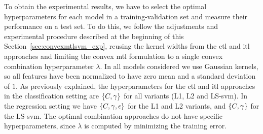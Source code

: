 To obtain the experimental results, we have to select the optimal hyperparameters for each model in a training-validation set and measure their performance on a test set. To do this, we follow the adjustments and experimental procedure described at the beginning of this Section~\ref{sec:convexmtlsvm_exp}, reusing the kernel widths from the \acrshort{ctl} and \acrshort{itl} approaches and limiting the convex \acrshort{mtl} formulation to a single convex combination hyperparameter $\lambda$.
%
In all models considered we use Gaussian kernels, so all features have been normalized to have zero mean and a standard deviation of $1$.
As previously explained, the hyperparameters for the \acrshort{ctl} and \acrshort{itl} approaches in the classification setting are $\left\{C, \gamma\right\}$ for all variants (L1, L2 and LS-\acrshort{svm}).
In the regression setting we have $\left\{C, \gamma, \epsilon\right\}$ for the L1 and L2 variants, and $\left\{C, \gamma\right\}$ for the LS-\acrshort{svm}.
%
%
The optimal combination approaches do not have specific hyperparameters, since $\lambda$ is computed by minimizing the training error.
%

